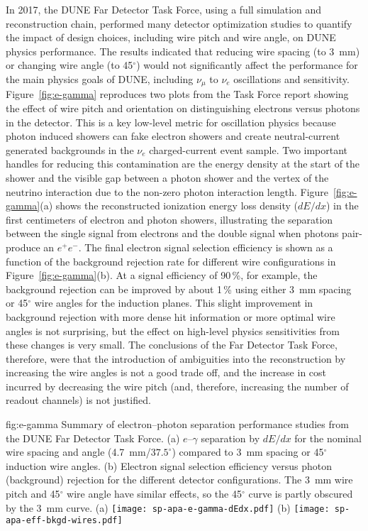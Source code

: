 \begin{itemize}
In 2017, the DUNE Far Detector Task Force, using a full  simulation and reconstruction chain, performed many detector optimization studies to quantify the impact of design choices, including wire pitch and wire angle, on DUNE physics performance.  The results indicated that reducing wire spacing (to \SI{3}{mm}) or changing wire angle (to \num{45}$^\circ$) would not significantly affect the performance for the main physics goals of DUNE, including $\nu_\mu $ to $\nu_e$ oscillations and  sensitivity.  Figure~\ref{fig:e-gamma} reproduces two plots from the Task Force report showing the effect of wire pitch and orientation on distinguishing electrons versus photons in the detector.  This is a key low-level metric for oscillation physics because photon induced showers can fake electron showers and create neutral-current generated backgrounds in the $\nu_e$ charged-current event sample. Two important handles for reducing this contamination are the energy density at the start of the shower and the visible gap between a photon shower and the vertex of the neutrino interaction due to the non-zero photon interaction length.  Figure~\ref{fig:e-gamma}(a) shows the reconstructed ionization energy loss density ($dE/dx$) in the first centimeters of electron and photon showers, illustrating the separation between the single  signal from electrons and the double  signal when photons pair-produce an $e^+e^-$.  The final electron signal selection efficiency is shown as a function of the background rejection rate for different wire configurations in Figure~\ref{fig:e-gamma}(b). At a signal efficiency of \num{90}\,\%, for example, the background rejection can be improved by about \num{1}\,\% using either \SI{3}{mm} spacing or 45$^\circ$ wire angles for the induction planes.  This slight improvement in background rejection with more dense hit information or more optimal wire angles is not surprising, but the effect on high-level physics sensitivities from these changes is very small. The conclusions of the Far Detector Task Force, therefore, were that the introduction of ambiguities into the reconstruction by increasing the wire angles is not a good trade off, and the increase in cost incurred by decreasing the wire pitch (and, therefore, increasing the number of readout channels) is not justified.  

\begin{dunefigure}{fig:e-gamma}
{Summary of electron--photon separation performance studies from the DUNE Far Detector Task Force. (a) $e$--$\gamma$ separation by $dE/dx$ for the nominal wire spacing and angle (\SI{4.7}{mm}/$37.5^\circ$) compared to \SI{3}{mm} spacing or 45$^\circ$ induction wire angles. (b) Electron signal selection efficiency versus photon (background) rejection for the different detector configurations. The \SI{3}{mm} wire pitch and 45$^\circ$ wire angle have similar effects, so the 45$^\circ$ curve is partly obscured by the \SI{3}{mm} curve.}
(a)
\texttt{[image: sp-apa-e-gamma-dEdx.pdf]} \qquad
(b)
\texttt{[image: sp-apa-eff-bkgd-wires.pdf]} 
\end{dunefigure}


\end{itemize}
